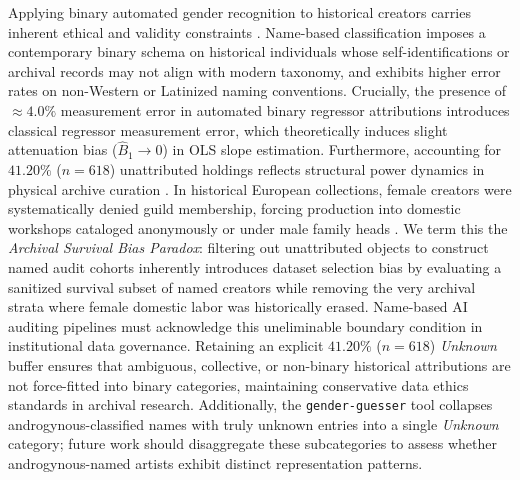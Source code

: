 \documentclass[pdflatex,sn-mathphys-num]{sn-jnl}%
\theoremstyle{thmstyleone}%
\theoremstyle{thmstyletwo}%
\theoremstyle{thmstylethree}%
\begin{document}
Applying binary automated gender recognition to historical creators carries inherent ethical and validity constraints \cite{keyes2018misgendering}. Name-based classification imposes a contemporary binary schema on historical individuals whose self-identifications or archival records may not align with modern taxonomy, and exhibits higher error rates on non-Western or Latinized naming conventions. Crucially, the presence of $\approx 4.0\%$ measurement error in automated binary regressor attributions introduces classical regressor measurement error, which theoretically induces slight attenuation bias ($\hat{B}_1 \to 0$) in OLS slope estimation. Furthermore, accounting for $41.20\%$ ($n=618$) unattributed holdings reflects structural power dynamics in physical archive curation \cite{bowker2000sorting, carlson2022museum, bailey2020gender, topaz2019diversity, parker1984subversive}. In historical European collections, female creators were systematically denied guild membership, forcing production into domestic workshops cataloged anonymously or under male family heads \cite{bailey2020gender, parker1984subversive}. We term this the \textit{Archival Survival Bias Paradox}: filtering out unattributed objects to construct named audit cohorts inherently introduces dataset selection bias by evaluating a sanitized survival subset of named creators while removing the very archival strata where female domestic labor was historically erased. Name-based AI auditing pipelines must acknowledge this uneliminable boundary condition in institutional data governance. Retaining an explicit $41.20\%$ ($n=618$) \textit{Unknown} buffer ensures that ambiguous, collective, or non-binary historical attributions are not force-fitted into binary categories, maintaining conservative data ethics standards in archival research. Additionally, the \texttt{gender-guesser} tool collapses androgynous-classified names with truly unknown entries into a single \textit{Unknown} category; future work should disaggregate these subcategories to assess whether androgynous-named artists exhibit distinct representation patterns.
\end{document}
